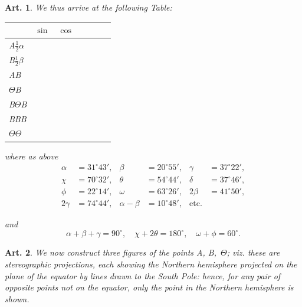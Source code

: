 \documentclass[11pt,a4paper]{article}
\theoremstyle{plain}
\newtheorem{art}{Art.}[section]
\begin{document}
\begin{art}
We thus arrive at the following Table:

\begin{center}
\begin{tabular}{|l|l|l|l|l|l|l|}
\hline
& $\sin$ & $\cos$ & & & & \\
\hline
A$\frac{1}{2}\alpha$ & & & & & & \\
B$\frac{1}{2}\beta$ & & & & & & \\
AB & & & & & & \\
$\Theta$B & & & & & & \\
B$\Theta$B & & & & & & \\
BBB & & & & & & \\
$\Theta$$\Theta$ & & & & & & \\
\hline
\end{tabular}
\end{center}

where as above
\begin{align*}
\alpha &= 31^\circ 43', & \beta &= 20^\circ 55', & \gamma &= 37^\circ 22', \\
\chi &= 70^\circ 32', & \theta &= 54^\circ 44', & \delta &= 37^\circ 46', \\
\phi &= 22^\circ 14', & \omega &= 63^\circ 26', & 2\beta &= 41^\circ 50', \\
2\gamma &= 74^\circ 44', & \alpha - \beta &= 10^\circ 48', & \text{etc.}
\end{align*}

and
\[
\alpha + \beta + \gamma = 90^\circ, \quad \chi + 2\theta = 180^\circ, \quad \omega + \phi = 60^\circ.
\]
\end{art}

\begin{art}
We now construct three figures of the points A, B,~$\Theta$; viz. these are
stereographic projections, each showing the Northern hemisphere projected
on the plane of the equator by lines drawn to the South Pole: hence, for
any pair of opposite points not on the equator, only the point in the
Northern hemisphere is shown.
\end{art}
\end{document}
